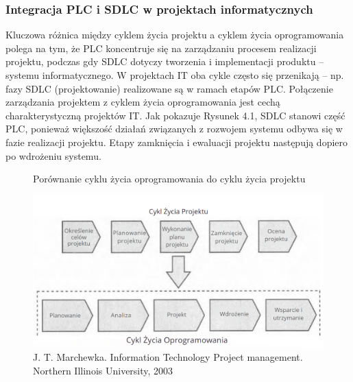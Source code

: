 \subsubsection{Integracja PLC i SDLC w projektach informatycznych}
Kluczowa różnica między cyklem życia projektu a cyklem życia oprogramowania polega na tym, że PLC koncentruje się na zarządzaniu procesem realizacji projektu, podczas gdy SDLC dotyczy tworzenia i implementacji produktu – systemu informatycznego.
W projektach IT oba cykle często się przenikają – np. fazy SDLC (projektowanie) realizowane są w ramach etapów PLC. Połączenie zarządzania projektem z cyklem życia oprogramowania jest cechą charakterystyczną projektów IT. Jak pokazuje Rysunek 4.1, SDLC stanowi część PLC, ponieważ większość działań związanych z rozwojem systemu odbywa się w fazie realizacji projektu. Etapy zamknięcia i ewaluacji projektu następują dopiero po wdrożeniu systemu.\autocite{ITPMMarchewka}

\begin{figure}
    \centering
    \caption{Porównanie cyklu życia oprogramowania do cyklu życia projektu}
    \includegraphics[width=14\linewidth]{img/plc_PL.png}
    \caption*{J. T. Marchewka. Information Technology Project management. Northern Illinois University, 2003}
\end{figure}

